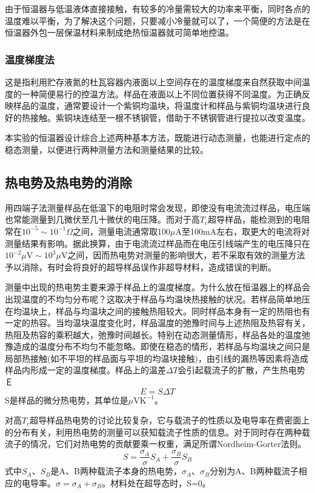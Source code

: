\documentclass[a4paper]{article}
\begin{document}
由于恒温器与低温液体直接接触，有较多的冷量需较大的功率来平衡，同时各点的温度难以平衡，为了解决这个问题，只要减小冷量就可以了，一个简便的方法是在恒温器外包一层保温材料来制成绝热恒温器就可简单地控温。
\subsubsection{温度梯度法}
这是指利用贮存液氮的杜瓦容器内液面以上空间存在的温度梯度来自然获取中间温度的一种简便易行的控温方法。样品在液面以上不同位置获得不同温度。为正确反映样品的温度，通常要设计一个紫铜均温块，将温度计和样品与紫铜均温块进行良好的热接触。紫铜块连结至一根不锈钢管，借助于不锈钢管进行提拉以改变温度。

本实验的恒温器设计综合上述两种基本方法，既能进行动态测量，也能进行定点的稳态测量，以便进行两种测量方法和测量结果的比较。
\subsection{热电势及热电势的消除}
用四端子法测量样品在低温下的电阻时常会发现，即使没有电流流过样品，电压端也常能测量到几微伏至几十微伏的电压降。而对于高$T_c$超导样品，能检测到的电阻常在$\text{10}^{-5}\sim\text{10}^{-1}\Omega$之间，测量电流通常取100$\mu$A至100mA左右，取更大的电流将对测量结果有影响。据此换算，由于电流流过样品而在电压引线端产生的电压降只在$\text{10}^{-2}\mu\text{V}\sim\text{10}^3\mu\text{V}$之间，因而热电势对测量的影响很大，若不采取有效的测量方法予以消除，有时会将良好的超导样品误作非超导材料，造成错误的判断。

测量中出现的热电势主要来源于样品上的温度梯度。为什么放在恒温器上的样品会出现温度的不均匀分布呢？这取决于样品与均温块热接触的状况。若样品简单地压在均温块上，样品与均温块之间的接触热阻较大。同时样品本身有一定的热阻也有一定的热容。当均温块温度变化时，样品温度的弛豫时间与上述热阻及热容有关，热阻及热容的乘积越大，弛豫时间越长。特别在动态测量情形，样品各处的温度弛豫造成的温度分布不均匀不能忽略。即使在稳态的情形，若样品与均温块之间只是局部热接触(如不平坦的样品面与平坦的均温块接触)，由引线的漏热等因素将造成样品内形成一定的温度梯度。样品上的温差$\Delta T$会引起载流子的扩散，产生热电势Ｅ
\begin{equation}
E = S\Delta T\label{eq1}
\end{equation}
S是样品的微分热电势，其单位是$\mu\text{VK}^{-1}$。

对高$T_c$超导样品热电势的讨论比较复杂，它与载流子的性质以及电导率在费密面上的分布有关，利用热电势的测量可以获知载流子性质的信息。对于同时存在两种载流子的情况，它们对热电势的贡献要乘一权重，满足所谓Nordheim-Gorter法则。
\begin{equation}
S = \frac{\sigma_A}{\sigma}S_A + \frac{\sigma_B}{\sigma}S_B\label{eq2}
\end{equation}
式中$S_A$、$S_B$是A、B两种载流子本身的热电势，$\sigma_A$、$\sigma_B$分别为A、B两种载流子相应的电导率。$\sigma = \sigma_A+\sigma_B$。材料处在超导态时，S=0。
\end{document}
